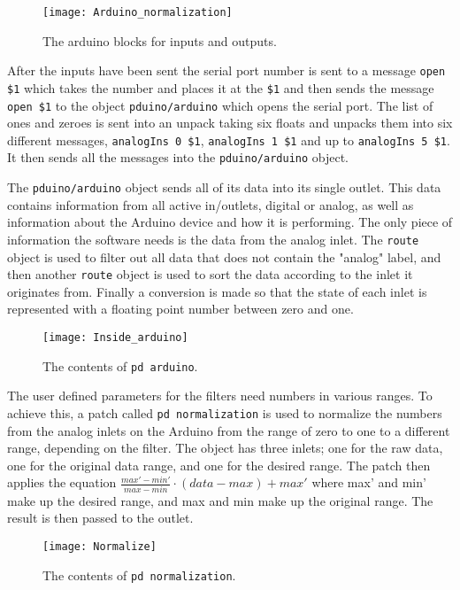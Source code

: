 \begin{figure}
\centering
\texttt{[image: Arduino\_normalization]}
\caption{The arduino blocks for inputs and outputs.}
\label{Fig:Arudino_normalization}
\end{figure}

After the inputs have been sent the serial port number is sent to a message \texttt{open \$1} which takes the number and places it at the \texttt{\$1} and then sends the message \texttt{open \$1} to the object \texttt{pduino/arduino}
which opens the serial port. The list of ones and zeroes is sent into an unpack taking six floats and unpacks them into six different messages, \texttt{analogIns 0 \$1}, \texttt{analogIns 1 \$1} and up to \texttt{analogIns 5 \$1}. It then sends all the messages into the \texttt{pduino/arduino} object.

The \texttt{pduino/arduino} object sends all of its data into its single outlet. This data contains information from all active in/outlets, digital or analog, as well as information about the Arduino device and how it is performing. The only piece of information the software needs is the data from the analog inlet. The \texttt{route} object is used to filter out all data that does not contain the "analog" label, and then another \texttt{route} object is used to sort the data according to the inlet it originates from. Finally a conversion is made so that the state of each inlet is represented with a floating point number between zero and one.


\begin{figure}
\centering
\texttt{[image: Inside\_arduino]}
\caption{The contents of \texttt{pd arduino}.}
\label{Fig:Inside_arduino}
\end{figure}

The user defined parameters for the filters need numbers in various ranges. To achieve this, a patch called \texttt{pd normalization} is used to normalize the numbers from the analog inlets on the Arduino from the range of zero to one to a different range, depending on the filter. The object has three inlets; one for the raw data, one for the original data range, and one for the desired range. The patch then applies the equation $\frac{max'-min'}{max-min}\cdot (data-max)+max'$ where max' and min' make up the desired range, and max and min make up the original range. The result is then passed to the outlet.

\begin{figure}
\centering
\texttt{[image: Normalize]}
\caption{The contents of \texttt{pd normalization}.}
\label{Fig:Normalize}
\end{figure}